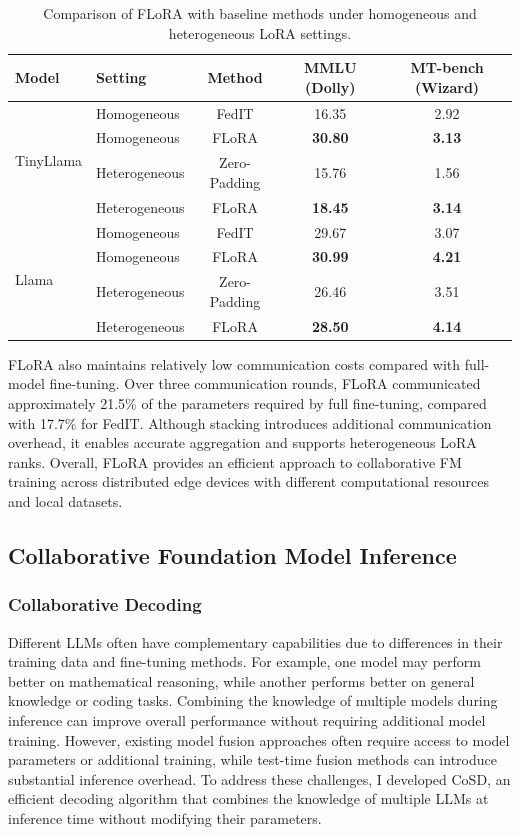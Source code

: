\documentclass[11pt]{article}
\begin{document}
\begin{table}[t]
\centering
\caption{Comparison of FLoRA with baseline methods under homogeneous and heterogeneous LoRA settings.}
\label{tab:flora_results}
\small
\setlength{\tabcolsep}{4.5pt}
\begin{tabular}{llccc}
\hline
Model & Setting & Method & MMLU (Dolly) & MT-bench (Wizard) \\
\hline
\multirow{4}{*}{TinyLlama}
& Homogeneous & FedIT & 16.35 & 2.92 \\
& Homogeneous & FLoRA & \textbf{30.80} & \textbf{3.13} \\
& Heterogeneous & Zero-Padding & 15.76 & 1.56 \\
& Heterogeneous & FLoRA & \textbf{18.45} & \textbf{3.14} \\
\hline
\multirow{4}{*}{Llama}
& Homogeneous & FedIT & 29.67 & 3.07 \\
& Homogeneous & FLoRA & \textbf{30.99} & \textbf{4.21} \\
& Heterogeneous & Zero-Padding & 26.46 & 3.51 \\
& Heterogeneous & FLoRA & \textbf{28.50} & \textbf{4.14} \\
\hline
\end{tabular}
\end{table}

FLoRA also maintains relatively low communication costs compared with full-model fine-tuning. Over three communication rounds, FLoRA communicated approximately 21.5\% of the parameters required by full fine-tuning, compared with 17.7\% for FedIT. Although stacking introduces additional communication overhead, it enables accurate aggregation and supports heterogeneous LoRA ranks. Overall, FLoRA provides an efficient approach to collaborative FM training across distributed edge devices with different computational resources and local datasets.


\subsection{Collaborative Foundation Model Inference}
\label{subsec:collaborative_inference}

\subsubsection{Collaborative Decoding}
\label{subsubsec:cosd}

Different LLMs often have complementary capabilities due to differences in their training data and fine-tuning methods. For example, one model may perform better on mathematical reasoning, while another performs better on general knowledge or coding tasks. Combining the knowledge of multiple models during inference can improve overall performance without requiring additional model training. However, existing model fusion approaches often require access to model parameters or additional training, while test-time fusion methods can introduce substantial inference overhead. To address these challenges, I developed CoSD, an efficient decoding algorithm that combines the knowledge of multiple LLMs at inference time without modifying their parameters.
\end{document}
